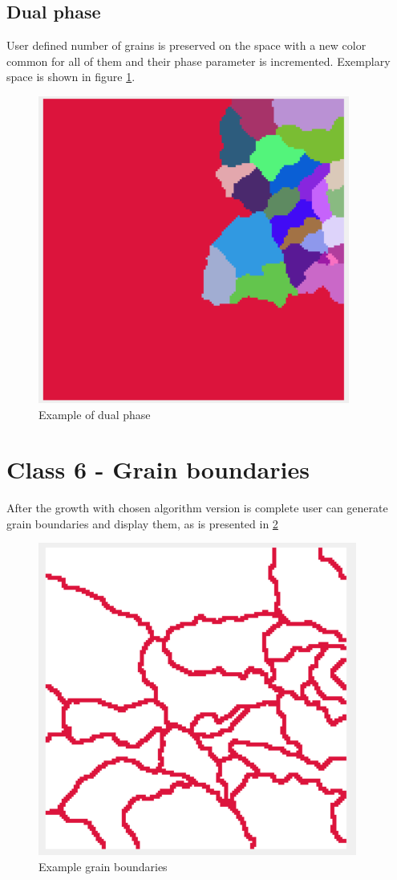 \documentclass[a4paper, 11pt]{article}
\begin{document}
\subsection{Dual phase}
User defined number of grains is preserved on the space with a new color common for all of them and their phase parameter is incremented. Exemplary space is shown in figure \ref{DualPhaseExampleLabel}.
\begin{figure}[H]
\centering
  \includegraphics{DualPhaseExample}
  \caption{Example of dual phase}
  \label{DualPhaseExampleLabel}
\end{figure}
\section*{Class 6 - Grain boundaries}
After the growth with chosen algorithm version is complete user can generate grain boundaries and display them, as is presented in \ref{GrainBoundariesExampleLabel}
\begin{figure}[H]
\centering
  \includegraphics[]{GrainBoundariesExample}
  \caption{Example grain boundaries}
  \label{GrainBoundariesExampleLabel}
\end{figure}
\end{document}
